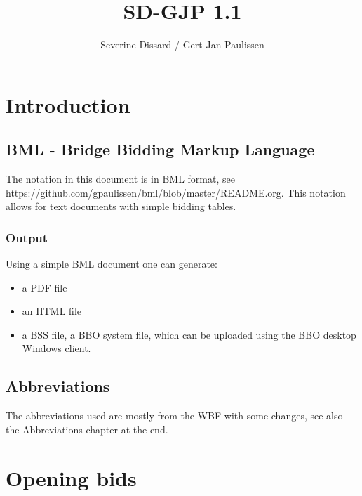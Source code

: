 \documentclass[a4paper]{article}
\title{SD-GJP 1.1}
\author{Severine Dissard / Gert-Jan Paulissen}
\begin{document}
\maketitle
\tableofcontents

\section{Introduction}

\subsection{BML - Bridge Bidding Markup Language}

The notation in this document is in BML format, see
https://github.com/gpaulissen/bml/blob/master/README.org.
\bigbreak
This notation allows for text documents with simple bidding tables.
\bigbreak
\subsubsection{Output}

Using a simple BML document one can generate:
\bigbreak
\begin{itemize}
\item a PDF file

\item an HTML file

\item a BSS file, a BBO system file, which can be uploaded using the BBO desktop Windows client.

\end{itemize}
\bigbreak
\subsection{Abbreviations}

The abbreviations used are mostly from the WBF with some changes, see also the
Abbreviations chapter at the end.
\bigbreak
\section{Opening bids}
\end{document}
